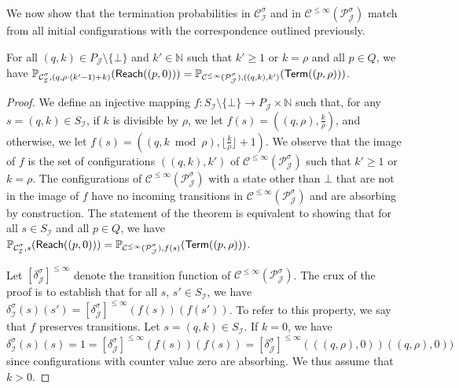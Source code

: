 \documentclass[a4paper,UKenglish,cleveref,autoref,thm-restate,colorlinks]{lipics-v2021}
\newcommand{\IN}{\mathbb{N}}
\newcommand{\mdpStateSpace}{S}
\newcommand{\mdpTrans}{\delta}
\newcommand{\ocStateSpace}{Q}
\newcommand{\ocState}{q}
\newcommand{\ocStateB}{p}
\newcommand{\ocCount}{k}
\newcommand{\ocCountB}{k'}
\newcommand{\ocConfig}{s}
\newcommand{\ocTrans}{\delta}
\newcommand{\period}{\rho}
\newcommand{\mchain}{\mathcal{C}}
\newcommand{\ocChain}{\mathcal{P}}
\newcommand{\ocChainFin}[2]{\mchain^{\leq #2}(#1)}
\newcommand{\intPart}{\mathcal{I}}
\newcommand{\intPartB}{\mathcal{J}}
\newcommand{\compressChainStrat}[1]{\mchain^{#1}_{\intPart}}
\newcommand{\compressChain}{\compressChainStrat{\strat}}
\newcommand{\compressChainStateSpace}{\mdpStateSpace_{\intPart}}
\newcommand{\compressChainTransTemplate}[2]{\mdpTrans^{#1}_{#2}}
\newcommand{\compressChainTrans}{\compressChainTransTemplate{\strat}{\intPart}}
\newcommand{\cisChainStrat}[1]{\ocChain^{#1}_{\intPartB}}
\newcommand{\cisChain}{\cisChainStrat{\strat}}
\newcommand{\cisChainStateSpace}{P_{\intPartB}}
\newcommand{\cisChainTransTemplate}[2]{\ocTrans_{#1}^{#2}}
\newcommand{\cisChainTrans}{\cisChainTransTemplate{\intPartB}{\strat}}
\newcommand{\reach}[1]{\mathsf{Reach}(#1)}
\newcommand{\termination}{\mathsf{Term}}
\newcommand{\selectiveTermination}[1]{\termination({#1})}
\newcommand{\stratGeneric}[1]{{\sigma_{#1}}}
\newcommand{\strat}{\stratGeneric{}}
\begin{document}
We now show that the termination probabilities in $\compressChain$ and in $\ocChainFin{\cisChain}{\infty}$ match from all initial configurations with the correspondence outlined previously.

\begin{theorem}\label{theorem:cis:compression:ocmc}
  For all $(\ocState, \ocCount)\in\cisChainStateSpace\setminus\{\bot\}$ and $\ocCountB\in\IN$ such that $\ocCountB\geq1$ or $\ocCount=\period$ and all $\ocStateB\in\ocStateSpace$, we have $\probaMCverb{\compressChain}{(\ocState, \period\cdot(\ocCount'-1)+\ocCount)}(\reach{(\ocStateB, 0)}) = \probaMCverb{\ocChainFin{\cisChain}{\infty}}{((\ocState, \ocCount), \ocCount')}(\selectiveTermination{(\ocStateB, \period)})$.
\end{theorem}
\begin{proof}
  We define an injective mapping $f\colon\compressChainStateSpace\setminus\{\bot\}\to\cisChainStateSpace\times\IN$ such that, for any $\ocConfig=(\ocState, \ocCount)\in\compressChainStateSpace$, if $\ocCount$ is divisible by $\period$, we let $f(\ocConfig) = ((\ocState, \period), \frac{\ocCount}{\period})$, and otherwise, we let $f(\ocConfig) = ((\ocState, \ocCount\bmod\period), \lfloor\frac{\ocCount}{\period}\rfloor + 1)$.
  We observe that the image of $f$ is the set of configurations $((\ocState, \ocCount), \ocCountB)$ of $\ocChainFin{\cisChain}{\infty}$ such that $\ocCountB\geq1$ or $\ocCount=\period$.
  The configurations of $\ocChainFin{\cisChain}{\infty}$ with a state other than $\bot$ that are not in the image of $f$ have no incoming transitions in $\ocChainFin{\cisChain}{\infty}$ and are absorbing by construction.
  The statement of the theorem is equivalent to showing that for all $\ocConfig\in\compressChainStateSpace$ and all $\ocStateB\in\ocStateSpace$, we have $\probaMCverb{\compressChain}{\ocConfig}(\reach{(\ocStateB, 0)}) = \probaMCverb{\ocChainFin{\cisChain}{\infty}}{f(\ocConfig)}(\selectiveTermination{(\ocStateB, \period)})$.

  
  Let $[\cisChainTrans]^{\leq\infty}$ denote the transition function of $\ocChainFin{\cisChain}{\infty}$.
  The crux of the proof is to establish that for all $\ocConfig$, $\ocConfig'\in\compressChainStateSpace$, we have $\compressChainTrans(\ocConfig)(\ocConfig')=[\cisChainTrans]^{\leq\infty}(f(\ocConfig))(f(\ocConfig'))$.
  To refer to this property, we say that $f$ preserves transitions.
  Let $\ocConfig = (\ocState, \ocCount)\in\compressChainStateSpace$.
  If $\ocCount=0$, we have $\compressChainTrans(\ocConfig)(\ocConfig) = 1 = [\cisChainTrans]^{\leq\infty}(f(\ocConfig))(f(\ocConfig)) = [\cisChainTrans]^{\leq\infty}(((\ocState, \period), 0))((\ocState, \period), 0))$ since configurations with counter value zero are absorbing.
  We thus assume that $\ocCount>0$.


\end{proof}
\end{document}
